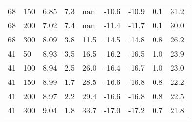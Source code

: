\begin{tabular}{lx{0.8cm}x{1.4cm}x{0.7cm}x{1cm}x{0.8cm}x{0.8cm}x{0.7cm}x{1.9cm}}
  68 &                       150 &                                        6.85 &                  7.3 &                            nan &                -10.6 &                   -10.9 & 0.1 &                                         31.2 \\
  68 &                       200 &                                        7.02 &                  7.4 &                            nan &                -11.4 &                   -11.7 & 0.1 &                                         30.0 \\
  68 &                       300 &                                        8.09 &                  3.8 &                           11.5 &                -14.5 &                   -14.8 & 0.8 &                                         26.2 \\
  41 &                        50 &                                        8.93 &                  3.5 &                           16.5 &                -16.2 &                   -16.5 & 1.0 &                                         23.9 \\
  41 &                       100 &                                        8.94 &                  2.5 &                           26.0 &                -16.4 &                   -16.7 & 1.0 &                                         23.0 \\
  41 &                       150 &                                        8.99 &                  1.7 &                           28.5 &                -16.6 &                   -16.8 & 0.8 &                                         22.2 \\
  41 &                       200 &                                        8.97 &                  2.2 &                           29.4 &                -16.6 &                   -16.8 & 0.8 &                                         22.5 \\
  41 &                       300 &                                        9.04 &                  1.8 &                           33.7 &                -17.0 &                   -17.2 & 0.7 &                                         21.8 \\
\bottomrule
\end{tabular}
